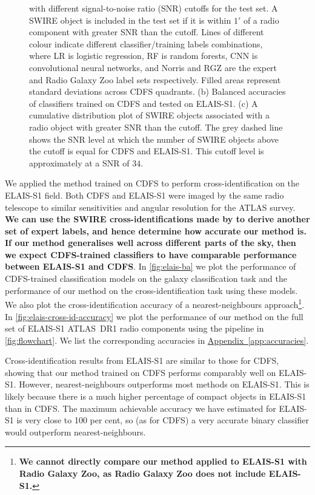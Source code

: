 \documentclass[fleqn,usenatbib,usedcolumn]{mnras}
\newcommand{\edited}[1]{{\bf {#1}}}
\newcommand{\aref}[1]{\hyperref[#1]{Appendix~\ref{#1}}}
\begin{document}
\begin{figure}
{      with different signal-to-noise ratio (SNR) cutoffs for the test set. A
      SWIRE object is included in the test set if it is within $1'$ of a radio
      component with greater SNR than the cutoff. Lines of different colour
      indicate different classifier/training labels combinations, where LR is
      logistic regression, RF is random forests, CNN is convolutional neural
      networks, and Norris and RGZ are the expert and Radio Galaxy Zoo label
      sets respectively. Filled areas represent standard deviations across
      CDFS quadrants. (b) Balanced accuracies of classifiers trained on CDFS
      and tested on ELAIS-S1. (c) A cumulative distribution plot of SWIRE
      objects associated with a radio object with greater SNR than the cutoff.
      The grey dashed line shows the SNR level at which the number of SWIRE
      objects above the cutoff is equal for CDFS and ELAIS-S1. This cutoff level
      is approximately at a SNR of $34$.}
    \label{fig:accuracies-flux}
  \end{figure}

  We applied the method trained on CDFS to perform cross-identification on the
  ELAIS-S1 field. Both CDFS and ELAIS-S1 were imaged by the same radio
  telescope to similar sensitivities and angular resolution for the ATLAS
  survey. \edited{We can use the SWIRE cross-identifications made by
  \citet{middelberg08} to derive another set of expert labels, and hence
  determine how accurate our method is. If our method generalises well across
  different parts of the sky, then we expect CDFS-trained classifiers to have
  comparable performance between ELAIS-S1 and CDFS}. In \autoref{fig:elais-ba}
  we plot the performance of CDFS-trained classification models on the galaxy classification task and
  the performance of our method on the cross-identification task using these models. We also plot
  the cross-identification accuracy of a nearest-neighbours approach\footnote{\edited{We cannot
  directly compare our method applied to ELAIS-S1 with Radio Galaxy Zoo, as
  Radio Galaxy Zoo does not include ELAIS-S1.}}. In
  \autoref{fig:elais-cross-id-accuracy} we plot the performance of our method
  on the full set of ELAIS-S1 ATLAS~DR1 radio components using the pipeline in
  \autoref{fig:flowchart}. We list the corresponding accuracies in
  \aref{app:accuracies}.

  Cross-identification results from ELAIS-S1 are similar to those for CDFS,
  showing that our method trained on CDFS performs comparably well on
  ELAIS-S1. However, nearest-neighbours outperforms most methods on ELAIS-S1.
  This is likely because there is a much higher percentage of compact objects
  in ELAIS-S1 than in CDFS. The maximum achievable accuracy we have estimated
  for ELAIS-S1 is very close to 100 per cent, so (as for CDFS) a very accurate
  binary classifier would outperform nearest-neighbours.
\end{document}
